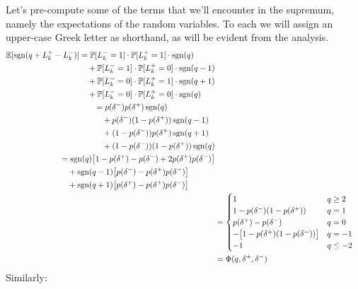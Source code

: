 Let's pre-compute some of the terms that we'll encounter in the supremum, namely the expectations of the random variables. To each we will assign an upper-case Greek letter as shorthand, as will be evident from the analysis.
\begin{align}
\begin{split}
\mathbb{E} [\operatorname{\mathrm{sgn}}(q + L_k^+ - L_k^-)] & = \mathbb{P}[L_k^- = 1] \cdot \mathbb{P}[L_k^+ = 1] \cdot \operatorname{\mathrm{sgn}}(q) \\
& \quad + \mathbb{P}[L_k^- = 1] \cdot \mathbb{P}[L_k^+ = 0] \cdot \operatorname{\mathrm{sgn}}(q - 1) \\
& \quad +  \mathbb{P}[L_k^- = 0] \cdot \mathbb{P}[L_k^+ = 1] \cdot \operatorname{\mathrm{sgn}}(q+1) \\
& \quad + \mathbb{P}[L_k^- = 0] \cdot \mathbb{P}[L_k^+ = 0] \cdot \operatorname{\mathrm{sgn}}(q) 
\end{split} \\
\begin{split}
& = p(\delta^-)p(\delta^+) \operatorname{\mathrm{sgn}}(q)  \\
& \quad + p(\delta^-) (1-p(\delta^+)) \operatorname{\mathrm{sgn}}(q - 1)  \\
& \quad + (1 - p(\delta^-)) p(\delta^+)  \operatorname{\mathrm{sgn}}(q+1)  \\
& \quad + (1 - p(\delta^-)) (1-p(\delta^+))  \operatorname{\mathrm{sgn}}(q)
\end{split} \\
\begin{split}
& = \operatorname{\mathrm{sgn}}(q) \bigl[ 1 - p(\delta^+) - p(\delta^-) + 2 p(\delta^+) p(\delta^-) \bigr] \\
& \quad + \operatorname{\mathrm{sgn}}(q-1) \bigl[ p(\delta^-)  - p(\delta^+) p(\delta^-) \bigr] \\
& \quad + \operatorname{\mathrm{sgn}}(q+1) \bigl[ p(\delta^+)  - p(\delta^+) p(\delta^-) \bigr]
\end{split} \\
& = \begin{cases} 
1 & q \geq 2 \\
1 - p(\delta^-)(1 - p(\delta^+)) & q = 1 \\
p(\delta^+) - p(\delta^-) & q = 0 \\
-\bigl[ 1 - p(\delta^+)(1 - p(\delta^-)) \bigr] & q = -1 \\
-1 & q \leq -2
\end{cases} \\
& = \Phi(q, \delta^+, \delta^-)
\end{align}
Similarly:
